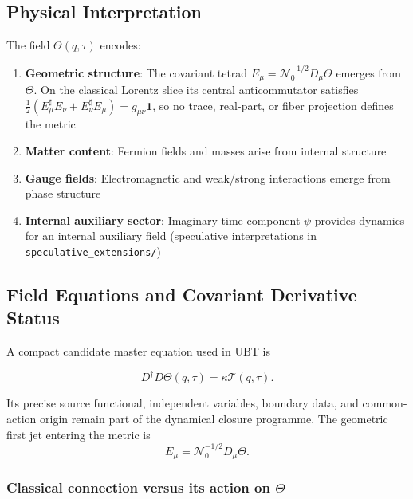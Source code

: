 \subsection{Physical Interpretation}

The field $\Theta(q,\tau)$ encodes:

\begin{enumerate}
    \item \textbf{Geometric structure}: The covariant tetrad $E_\mu=\mathcal N_0^{-1/2}D_\mu\Theta$ emerges from $\Theta$.  On the classical Lorentz slice its central anticommutator satisfies $\tfrac12(E_\mu^\sharp E_\nu+E_\nu^\sharp E_\mu)=g_{\mu\nu}\mathbf1$, so no trace, real-part, or fiber projection defines the metric
    
    \item \textbf{Matter content}: Fermion fields and masses arise from internal structure
    
    \item \textbf{Gauge fields}: Electromagnetic and weak/strong interactions emerge from phase structure
    
    \item \textbf{Internal auxiliary sector}: Imaginary time component $\psi$ provides dynamics for an internal auxiliary field (speculative interpretations in \texttt{speculative\_extensions/})
\end{enumerate}

\subsection{Field Equations and Covariant Derivative Status}

A compact candidate master equation used in UBT is

\begin{equation}
\label{eq:canonical:theta_equation}
D^\dagger D\Theta(q,\tau)=\kappa\mathcal T(q,\tau).
\end{equation}

Its precise source functional, independent variables, boundary data, and
common-action origin remain part of the dynamical closure programme.  The
geometric first jet entering the metric is
\begin{equation}
 E_\mu=\mathcal N_0^{-1/2}D_\mu\Theta.
\end{equation}

\subsubsection{Classical connection versus its action on $\Theta$}

